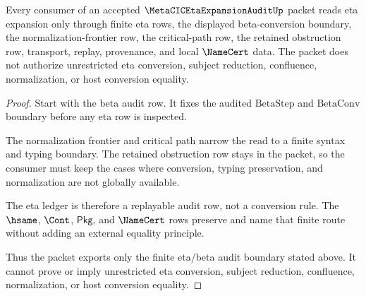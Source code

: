 \begin{theorem}
\label{thm:metacic-eta-expansion-audit-boundary}
Every consumer of an accepted $\MetaCICEtaExpansionAuditUp$ packet reads eta
expansion only through finite eta rows, the displayed beta-conversion boundary,
the normalization-frontier row, the critical-path row, the retained obstruction
row, transport, replay, provenance, and local $\NameCert$ data. The packet
does not authorize unrestricted eta conversion, subject reduction, confluence,
normalization, or host conversion equality.
\end{theorem}
\begin{proof}
Start with the beta audit row. It fixes the audited $\mathrm{BetaStep}$ and
$\mathrm{BetaConv}$ boundary before any eta row is inspected.

The normalization frontier and critical path narrow the read to a finite syntax
and typing boundary. The retained obstruction row stays in the packet, so the
consumer must keep the cases where conversion, typing preservation, and
normalization are not globally available.

The eta ledger is therefore a replayable audit row, not a conversion rule. The
$\hsame$, $\Cont$, $\mathsf{Pkg}$, and $\NameCert$ rows preserve and name that
finite route without adding an external equality principle.

Thus the packet exports only the finite eta/beta audit boundary stated above.
It cannot prove or imply unrestricted eta conversion, subject reduction,
confluence, normalization, or host conversion equality.
\end{proof}



